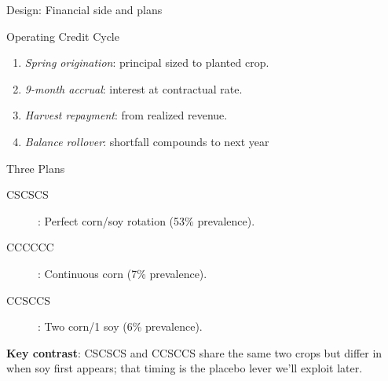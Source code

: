 \documentclass[notes, 10pt, aspectratio=169]{beamer}
\begin{document}
\begin{frame}{Design: Financial side and plans}
    \begin{block}{Operating Credit Cycle}
        \begin{enumerate}
            \item \textit{Spring origination}: principal sized to planted crop.
            \item \textit{9-month accrual}: interest at contractual rate.
            \item \textit{Harvest repayment}: from realized revenue.
            \item \textit{Balance rollover}: shortfall compounds to next year
        \end{enumerate}
    \end{block}
\begin{block}{Three Plans}
  \begin{description}
  \item[CSCSCS]: Perfect corn/soy rotation (53\% prevalence).
  \item[CCCCCC]: Continuous corn (7\% prevalence).
  \item[CCSCCS]: Two corn/1 soy (6\% prevalence).
  \end{description}  
\end{block}    

\textbf{Key contrast}: CSCSCS and CCSCCS share the same two crops but differ in when soy first appears; that timing is the placebo lever we'll exploit later.
\end{frame}
\end{document}
